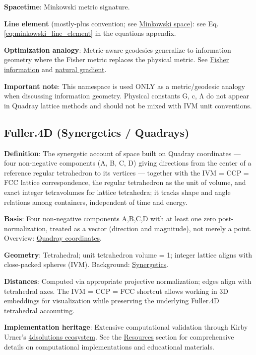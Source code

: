 \documentclass[
  10pt,
]{article}
\begin{document}
\textbf{Spacetime}: Minkowski metric signature.

\textbf{Line element} (mostly-plus convention; see
\href{https://en.wikipedia.org/wiki/Minkowski_space}{Minkowski space}):
see Eq. \eqref{eq:minkowski_line_element} in the equations appendix.

\textbf{Optimization analogy}: Metric-aware geodesics generalize to
information geometry where the Fisher metric replaces the physical
metric. See
\href{https://en.wikipedia.org/wiki/Fisher_information}{Fisher
information} and
\href{https://en.wikipedia.org/wiki/Natural_gradient}{natural gradient}.

\textbf{Important note}: This namespace is used ONLY as a
metric/geodesic analogy when discussing information geometry. Physical
constants G, c, Λ do not appear in Quadray lattice methods and should
not be mixed with IVM unit conventions.

\subsection{Fuller.4D (Synergetics /
Quadrays)}\label{fuller.4d-synergetics-quadrays}

\textbf{Definition}: The synergetic account of space built on Quadray
coordinates --- four non-negative components (A, B, C, D) giving
directions from the center of a reference regular tetrahedron to its
vertices --- together with the IVM = CCP = FCC lattice correspondence,
the regular tetrahedron as the unit of volume, and exact integer
tetravolumes for lattice tetrahedra; it tracks shape and angle relations
among containers, independent of time and energy.

\textbf{Basis}: Four non-negative components A,B,C,D with at least one
zero post-normalization, treated as a vector (direction and magnitude),
not merely a point. Overview:
\href{https://en.wikipedia.org/wiki/Quadray_coordinates}{Quadray
coordinates}.

\textbf{Geometry}: Tetrahedral; unit tetrahedron volume = 1; integer
lattice aligns with close-packed spheres (IVM). Background:
\href{https://en.wikipedia.org/wiki/Synergetics_(Fuller)}{Synergetics}.

\textbf{Distances}: Computed via appropriate projective normalization;
edges align with tetrahedral axes. The IVM = CCP = FCC shortcut allows
working in 3D embeddings for visualization while preserving the
underlying Fuller.4D tetrahedral accounting.

\textbf{Implementation heritage}: Extensive computational validation
through Kirby Urner's \href{https://github.com/4dsolutions}{4dsolutions
ecosystem}. See the \href{07_resources.md}{Resources} section for
comprehensive details on computational implementations and educational
materials.
\end{document}
